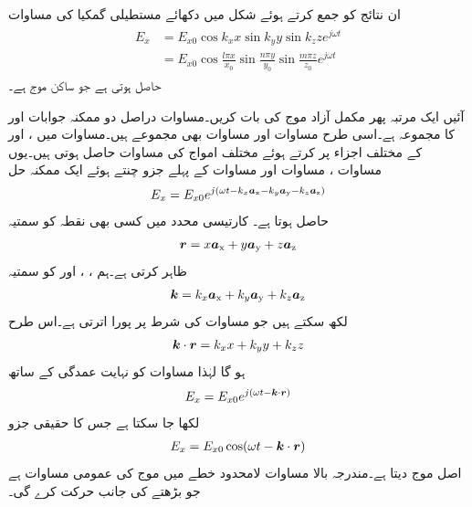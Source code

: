 ان نتائج کو جمع کرتے ہوئے  شکل  میں دکھائے مستطیلی گمکیا کی مساوات
\begin{gather}
\begin{aligned}
E_x&=E_{x0} \cos k_x x \sin k_y y \sin k_z z e^{j \omega t}\\
&=E_{x0} \cos \frac{l \pi x }{x_0} \sin \frac{n \pi y}{y_0} \sin \frac{m \pi z}{z_0} e^{j \omega t}
\end{aligned}
\end{gather}
حاصل ہوتی ہے جو ساکن موج ہے۔


آئیں ایک مرتبہ پھر مکمل آزاد موج کی بات کریں۔مساوات  دراصل دو ممکنہ جوابات  اور  کا مجموعہ ہے۔اسی طرح مساوات   اور مساوات  بھی مجموعے ہیں۔مساوات  میں ،  اور  کے مختلف اجزاء پر کرتے ہوئے مختلف امواج کی مساوات حاصل ہوتی ہیں۔یوں مساوات ، مساوات   اور مساوات  کے پہلے جزو چنتے ہوئے ایک ممکنہ حل
\begin{align}\label{مساوات_مویج_گمکی_عمومی_ث}
E_x=E_{x0} e^{j (\omega t -k_x {\boldsymbol{a}}_{\textup{x}} -k_y {\boldsymbol{a}}_{\textup{y}}-k_z {\boldsymbol{a}}_{\textup{z}})}
\end{align}
حاصل ہوتا ہے۔ کارتیسی محدد میں کسی بھی نقطہ  کو سمتیہ
\begin{align}\label{مساوات_مویج_گمکی_عمومی_ج}
{\ensuremath{{\boldsymbol{r}}}}=x{\boldsymbol{a}}_{\textup{x}}+y{\boldsymbol{a}}_{\textup{y}}+z{\boldsymbol{a}}_{\textup{z}}
\end{align}
ظاہر کرتی ہے۔ہم ، ،   اور  کو سمتیہ
\begin{align}\label{مساوات_مویج_گمکی_عمومی_چ}
{\ensuremath{{\boldsymbol{k}}}}=k_x {\boldsymbol{a}}_{\textup{x}}+k_y {\boldsymbol{a}}_{\textup{y}} +k_z {\boldsymbol{a}}_{\textup{z}}
\end{align}
لکھ سکتے ہیں جو مساوات  کی شرط پر پورا اترتی ہے۔اس طرح 
\begin{align}\label{مساوات_مویج_گمکی_عمومی_ح}
{\ensuremath{{\boldsymbol{k}}}} \cdot {\ensuremath{{\boldsymbol{r}}}}=k_x x +k_y y +k_z z
\end{align}
ہو گا لہٰذا مساوات  کو نہایت عمدگی کے ساتھ
\begin{align}\label{مساوات_مویج_گمکی_عمومی_خ}
E_x=E_{x0} e^{j(\omega t-{{\boldsymbol{k}}} \cdot {\ensuremath{{\boldsymbol{r}}}})}
\end{align}
لکھا جا سکتا ہے جس کا حقیقی جزو
\begin{align}\label{مساوات_مویج_گمکی_عمومی_د}
E_x=E_{x0} \cos (\omega t -{{\boldsymbol{k}}} \cdot {\ensuremath{{\boldsymbol{r}}}})
\end{align}
اصل موج دیتا ہے۔مندرجہ بالا مساوات لامحدود خطے میں موج کی عمومی مساوات ہے جو بڑھتے  کی جانب حرکت کرے گی۔

